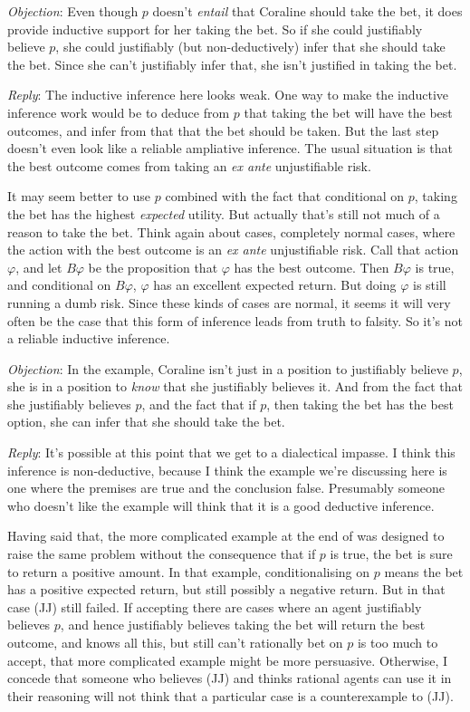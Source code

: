\documentclass[11pt,oneside]{book}
\newcommand{\objrep}[2]{
\bigskip
\noindent \textit{Objection}: #1

\medskip
\noindent \textit{Reply}: #2

}
\begin{document}
\objrep{
Even though $p$ doesn't \textit{entail} that Coraline should take the bet, it does provide inductive support for her taking the bet. So if she could justifiably believe $p$, she could justifiably (but non-deductively) infer that she should take the bet. Since she can't justifiably infer that, she isn't justified in taking the bet.
}
{The inductive inference here looks weak. One way to make the inductive inference work would be to deduce from $p$ that taking the bet will have the best outcomes, and infer from that that the bet should be taken. But the last step doesn't even look like a reliable ampliative inference. The usual situation is that the best outcome comes from taking an \textit{ex ante} unjustifiable risk.

It may seem better to use $p$ combined with the fact that conditional on $p$, taking the bet has the highest \textit{expected} utility. But actually that's still not much of a reason to take the bet. Think again about cases, completely normal cases, where the action with the best outcome is an \textit{ex ante} unjustifiable risk. Call that action $\varphi$, and let $B \varphi$ be the proposition that $\varphi$ has the best outcome. Then $B \varphi$ is true, and conditional on $B \varphi$, $\varphi$ has an excellent expected return. But doing $\varphi$ is still running a dumb risk. Since these kinds of cases are normal, it seems it will very often be the case that this form of inference leads from truth to falsity. So it's not a reliable inductive inference.}

\objrep{In the example, Coraline isn't just in a position to justifiably believe $p$, she is in a position to \textit{know} that she justifiably believes it. And from the fact that she justifiably believes $p$, and the fact that if $p$, then taking the bet has the best option, she can infer that she should take the bet.}
{It's possible at this point that we get to a dialectical impasse. I think this inference is non-deductive, because I think the example we're discussing here is one where the premises are true and the conclusion false. Presumably someone who doesn't like the example will think that it is a good deductive inference.

Having said that, the more complicated example at the end of \cite{Weatherson2005-WEACWD} was designed to raise the same problem without the consequence that if $p$ is true, the bet is sure to return a positive amount. In that example, conditionalising on $p$ means the bet has a positive expected return, but still possibly a negative return. But in that case (JJ) still failed. If accepting there are cases where an agent justifiably believes $p$, and hence justifiably believes taking the bet will return the best outcome, and knows all this, but still can't rationally bet on $p$ is too much to accept, that more complicated example might be more persuasive. Otherwise, I concede that someone who believes (JJ) and thinks rational agents can use it in their reasoning will not think that a particular case is a counterexample to (JJ).}
\end{document}
